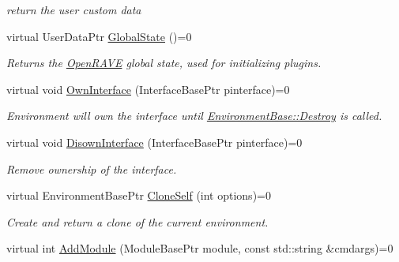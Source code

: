 \begin{DoxyCompactItemize}
\begin{DoxyCompactList}\small\item\em return the user custom data \item\end{DoxyCompactList}\item 
\hypertarget{classOpenRAVE_1_1EnvironmentBase_ae3e4c1172fe049726b74a1cb58e13a03}{
virtual UserDataPtr \hyperlink{classOpenRAVE_1_1EnvironmentBase_ae3e4c1172fe049726b74a1cb58e13a03}{GlobalState} ()=0}
\label{classOpenRAVE_1_1EnvironmentBase_ae3e4c1172fe049726b74a1cb58e13a03}

\begin{DoxyCompactList}\small\item\em Returns the \hyperlink{namespaceOpenRAVE}{OpenRAVE} global state, used for initializing plugins. \item\end{DoxyCompactList}\item 
\hypertarget{classOpenRAVE_1_1EnvironmentBase_a86cc388f010ecee390ea6eadedb238e8}{
virtual void \hyperlink{classOpenRAVE_1_1EnvironmentBase_a86cc388f010ecee390ea6eadedb238e8}{OwnInterface} (InterfaceBasePtr pinterface)=0}
\label{classOpenRAVE_1_1EnvironmentBase_a86cc388f010ecee390ea6eadedb238e8}

\begin{DoxyCompactList}\small\item\em Environment will own the interface until \hyperlink{classOpenRAVE_1_1EnvironmentBase_a84693792fa8cba90b312c0b1caf53716}{EnvironmentBase::Destroy} is called. \item\end{DoxyCompactList}\item 
\hypertarget{classOpenRAVE_1_1EnvironmentBase_a714c39fcfdcdf7f096335896c998b30f}{
virtual void \hyperlink{classOpenRAVE_1_1EnvironmentBase_a714c39fcfdcdf7f096335896c998b30f}{DisownInterface} (InterfaceBasePtr pinterface)=0}
\label{classOpenRAVE_1_1EnvironmentBase_a714c39fcfdcdf7f096335896c998b30f}

\begin{DoxyCompactList}\small\item\em Remove ownership of the interface. \item\end{DoxyCompactList}\item 
virtual EnvironmentBasePtr \hyperlink{classOpenRAVE_1_1EnvironmentBase_aa3144d0f14a2da063a5dfde496941c40}{CloneSelf} (int options)=0
\begin{DoxyCompactList}\small\item\em Create and return a clone of the current environment. \item\end{DoxyCompactList}\item 
\hypertarget{classOpenRAVE_1_1EnvironmentBase_aa5e2d9fb5347f1aff0b726279b98b130}{
virtual int \hyperlink{classOpenRAVE_1_1EnvironmentBase_aa5e2d9fb5347f1aff0b726279b98b130}{AddModule} (ModuleBasePtr module, const std::string \&cmdargs)=0}
\label{classOpenRAVE_1_1EnvironmentBase_aa5e2d9fb5347f1aff0b726279b98b130}


\end{DoxyCompactItemize}
